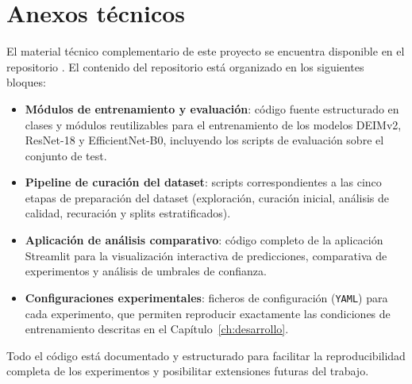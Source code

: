 \chapter{Anexos técnicos}
\label{ch:anexos}

El material técnico complementario de este proyecto se encuentra disponible en el repositorio \thegitrepo{}. El contenido del repositorio está organizado en los siguientes bloques:

\begin{itemize}
    \item \textbf{Módulos de entrenamiento y evaluación}: código fuente estructurado en clases y módulos reutilizables para el entrenamiento de los modelos DEIMv2, ResNet-18 y EfficientNet-B0, incluyendo los scripts de evaluación sobre el conjunto de test.
    \item \textbf{Pipeline de curación del dataset}: scripts correspondientes a las cinco etapas de preparación del dataset (exploración, curación inicial, análisis de calidad, recuración y splits estratificados).
    \item \textbf{Aplicación de análisis comparativo}: código completo de la aplicación Streamlit para la visualización interactiva de predicciones, comparativa de experimentos y análisis de umbrales de confianza.
    \item \textbf{Configuraciones experimentales}: ficheros de configuración (\texttt{YAML}) para cada experimento, que permiten reproducir exactamente las condiciones de entrenamiento descritas en el Capítulo~\ref{ch:desarrollo}.
\end{itemize}

Todo el código está documentado y estructurado para facilitar la reproducibilidad completa de los experimentos y posibilitar extensiones futuras del trabajo.
